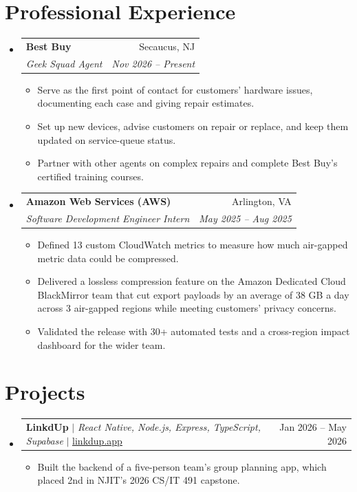 \documentclass[letterpaper,11pt]{article}
\makeatletter
\newcommand{\resumeItem}[1]{\item\small{#1}}
\newcommand{\resumeSubheading}[4]{
  \vspace{-2pt}\item
    \begin{tabular*}{0.97\textwidth}[t]{l@{\extracolsep{\fill}}r}
      \textbf{#1} & #2 \\
      \textit{\small#3} & \textit{\small #4} \\
    \end{tabular*}\vspace{-7pt}
}
\newcommand{\resumeProjectHeading}[2]{
    \item
    \begin{tabular*}{0.97\textwidth}{l@{\extracolsep{\fill}}r}
      \small#1 & #2 \\
    \end{tabular*}\vspace{-7pt}
}
\newcommand{\resumeSubHeadingListStart}{\begin{itemize}[leftmargin=0.15in, label={}, itemsep=1pt, parsep=0pt, topsep=2pt]}
\newcommand{\resumeSubHeadingListEnd}{\end{itemize}}
\newcommand{\resumeItemListStart}{\begin{itemize}[topsep=6pt,itemsep=0pt,parsep=0pt,partopsep=0pt]}
\newcommand{\resumeItemListEnd}{\end{itemize}\vspace{-5pt}}
\makeatother
\begin{document}
\section{Professional Experience}
  \resumeSubHeadingListStart
    \resumeSubheading
      {Best Buy}{Secaucus, NJ}
      {Geek Squad Agent}{Nov 2026 -- Present}
      \resumeItemListStart
        \resumeItem{Serve as the first point of contact for customers' hardware issues, documenting each case and giving repair estimates.}
        \resumeItem{Set up new devices, advise customers on repair or replace, and keep them updated on service-queue status.}
        \resumeItem{Partner with other agents on complex repairs and complete Best Buy's certified training courses.}
      \resumeItemListEnd
    \resumeSubheading
      {Amazon Web Services (AWS)}{Arlington, VA}
      {Software Development Engineer Intern}{May 2025 -- Aug 2025}
      \resumeItemListStart
        \resumeItem{Defined 13 custom CloudWatch metrics to measure how much air-gapped metric data could be compressed.}
        \resumeItem{Delivered a lossless compression feature on the Amazon Dedicated Cloud BlackMirror team that cut export payloads by an average of 38 GB a day across 3 air-gapped regions while meeting customers' privacy concerns.}
        \resumeItem{Validated the release with 30+ automated tests and a cross-region impact dashboard for the wider team.}
      \resumeItemListEnd
  \resumeSubHeadingListEnd

\section{Projects}
    \resumeSubHeadingListStart
      \resumeProjectHeading
          {\textbf{LinkdUp} $|$ \emph{React Native, Node.js, Express, TypeScript, Supabase} $|$ \href{https://linkdup.app}{\underline{linkdup.app}}}{Jan 2026 -- May 2026}
          \resumeItemListStart
            \resumeItem{Built the backend of a five-person team's group planning app, which placed 2nd in NJIT's 2026 CS/IT 491 capstone.}
          \resumeItemListEnd
    \resumeSubHeadingListEnd
\end{document}
